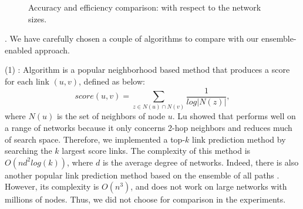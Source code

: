 \begin{figure}[tb!]
   \hspace{-2ex}
  \hspace{-2ex}
  \hspace{-2ex}
  \vspace{-1ex}
  \caption{Accuracy and efficiency comparison: with respect to the network sizes.}\label{fig_exp_1_2}
  \vspace{-2ex}
\end{figure}




. We have carefully chosen a couple of algorithms
to compare with our ensemble-enabled approach.


\sstab (1) \Adamic \cite{adamic}: Algorithm \Aa is a popular neighborhood based method that
  produces a score for each link $(u, v)$, defined as below:
  \[ score(u, v) = \sum_{z \in N(u)\cap N(v)}\frac{1}{log|N(z)|}, \]
  where $N(u)$ is the set of neighbors of node $u$. Lu \cite{linyuan-2011} showed that
  \Aa performs well on a range of networks because it only concerns 2-hop neighbors and
  reduces much of search space. Therefore, we implemented a top-$k$ link prediction
  method by searching the $k$ largest \Aa score links. The complexity of this method is
  $O(nd^2log(k))$, where $d$ is the average degree of networks. Indeed, there is also another popular link
  prediction method \Katz based on the ensemble of all paths \cite{katz-1953}. However, its
  complexity is $O(n^3)$, and does not work on large networks with millions
  of nodes. Thus, we did not choose \Katz for comparison in the experiments.



